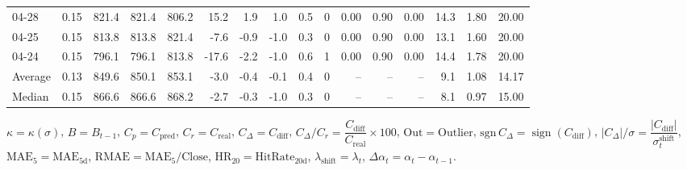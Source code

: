 \begin{threeparttable}
{\begin{tabular}{lrrrrrrrrrrrrrrr}
  04-28 &     0.15 & 821.4 & 821.4 & 806.2 &       15.2 &            1.9 &                      1.0 &                 0.5 &              0 &       0.00 &      0.90 &           0.00 &             14.3 &            1.80 &                  20.00 \\
  04-25 &     0.15 & 813.8 & 813.8 & 821.4 &       -7.6 &           -0.9 &                     -1.0 &                 0.3 &              0 &       0.00 &      0.90 &           0.00 &             13.1 &            1.60 &                  20.00 \\
  04-24 &     0.15 & 796.1 & 796.1 & 813.8 &      -17.6 &           -2.2 &                     -1.0 &                 0.6 &              1 &       0.00 &      0.90 &           0.00 &             14.4 &            1.78 &                  20.00 \\
Average &     0.13 & 849.6 & 850.1 & 853.1 &       -3.0 &           -0.4 &                     -0.1 &                 0.4 &              0 &         -- &        -- &             -- &              9.1 &            1.08 &                  14.17 \\
 Median &     0.15 & 866.6 & 866.6 & 868.2 &       -2.7 &           -0.3 &                     -1.0 &                 0.3 &              0 &         -- &        -- &             -- &              8.1 &            0.97 &                  15.00 \\
\bottomrule
\end{tabular}
}
\begin{tablenotes}\footnotesize
\item $\kappa=\kappa(\sigma)$, $B=B_{t-1}$, $C_p=C_{\text{pred}}$, $C_r=C_{\text{real}}$, $C_\Delta=C_{\text{diff}}$, $C_\Delta/C_r=\dfrac{C_{\text{diff}}}{C_{\text{real}}}\times100$, $\mathrm{Out}=\text{Outlier}$, $\mathrm{sgn}\,C_\Delta=\operatorname{sign}(C_{\text{diff}})$, $|C_\Delta|/\sigma=\dfrac{|C_{\text{diff}}|}{\sigma_t^{\text{shift}}}$, $\mathrm{MAE}_5=\mathrm{MAE}_{5\text{d}}$, $\mathrm{RMAE}= \mathrm{MAE}_5 / \text{Close}$, $\mathrm{HR}_{20}=\mathrm{HitRate}_{20\text{d}}$, 
$\lambda_{\text{shift}}=\lambda_t$, 
$\Delta\alpha_t=\alpha_t-\alpha_{t-1}$.
\end{tablenotes}
\end{threeparttable}
\endgroup

